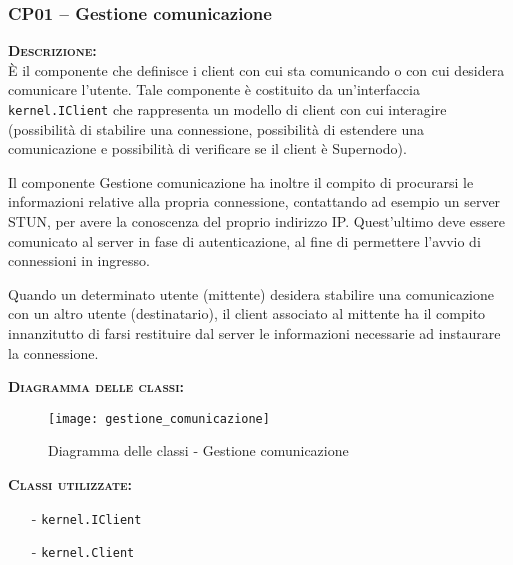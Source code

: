 \subsubsection{CP01 -- Gestione comunicazione}

\begin{description}
	\item{\scshape\bfseries Descrizione:}\\
È il componente che definisce i client con cui sta comunicando o con cui desidera comunicare l'utente. Tale componente è costituito da un'interfaccia \texttt{kernel.IClient} che rappresenta un modello di client con cui interagire (possibilità di stabilire una connessione, possibilità di estendere una comunicazione e possibilità di verificare se il client è Supernodo).

Il componente \textsf{Gestione comunicazione} ha inoltre il compito di procurarsi le informazioni relative alla propria connessione, contattando ad esempio un server STUN, per avere la conoscenza del proprio indirizzo IP\@. Quest'ultimo deve essere comunicato al server in fase di autenticazione, al fine di permettere l'avvio di connessioni in ingresso.

Quando un determinato utente (mittente) desidera stabilire una comunicazione con un altro utente (destinatario), il client associato al mittente ha il compito innanzitutto di farsi restituire dal server le informazioni necessarie ad instaurare la connessione.

	\item{\scshape\bfseries Diagramma delle classi:}
  \begin{figure}[H]
    \centering
    \texttt{[image: gestione\_comunicazione]}
    \caption{Diagramma delle classi - Gestione comunicazione}\label{fig:gestionecomunicazione}
  \end{figure}

	\item{\scshape\bfseries Classi utilizzate:} 
	\begin{itemize}[noitemsep,nolistsep]
		\item[-] \texttt{kernel.IClient}
		\item[-] \texttt{kernel.Client}
	\end{itemize}  
\end{description}

